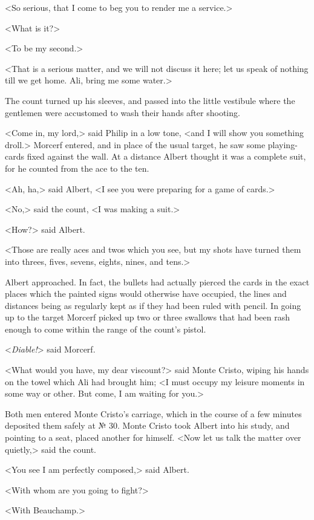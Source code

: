  <So serious, that I come to beg you to render me a service.> 

 <What is it?> 

 <To be my second.> 

 <That is a serious matter, and we will not discuss it here; let us speak of nothing till we get home. Ali, bring me some water.> 

 The count turned up his sleeves, and passed into the little vestibule where the gentlemen were accustomed to wash their hands after shooting. 

 <Come in, my lord,> said Philip in a low tone, <and I will show you something droll.> Morcerf entered, and in place of the usual target, he saw some playing-cards fixed against the wall. At a distance Albert thought it was a complete suit, for he counted from the ace to the ten. 

 <Ah, ha,> said Albert, <I see you were preparing for a game of cards.> 

 <No,> said the count, <I was making a suit.> 

 <How?> said Albert. 

 <Those are really aces and twos which you see, but my shots have turned them into threes, fives, sevens, eights, nines, and tens.> 

 Albert approached. In fact, the bullets had actually pierced the cards in the exact places which the painted signs would otherwise have occupied, the lines and distances being as regularly kept as if they had been ruled with pencil. In going up to the target Morcerf picked up two or three swallows that had been rash enough to come within the range of the count's pistol. 

 <\textit{Diable!}> said Morcerf. 

 <What would you have, my dear viscount?> said Monte Cristo, wiping his hands on the towel which Ali had brought him; <I must occupy my leisure moments in some way or other. But come, I am waiting for you.> 

 Both men entered Monte Cristo's carriage, which in the course of a few minutes deposited them safely at № 30. Monte Cristo took Albert into his study, and pointing to a seat, placed another for himself. <Now let us talk the matter over quietly,> said the count. 

 <You see I am perfectly composed,> said Albert. 

 <With whom are you going to fight?> 

 <With Beauchamp.> 

